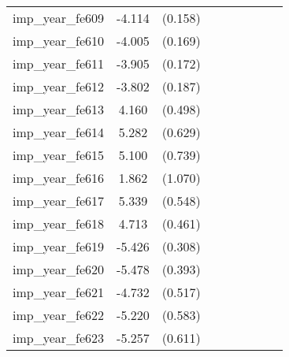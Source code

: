 {\begin{tabular}{l*{4}{cc}}
imp\_year\_fe609&   -4.114\sym{***}&  (0.158)&                  &         &                  &         &                  &         \\
imp\_year\_fe610&   -4.005\sym{***}&  (0.169)&                  &         &                  &         &                  &         \\
imp\_year\_fe611&   -3.905\sym{***}&  (0.172)&                  &         &                  &         &                  &         \\
imp\_year\_fe612&   -3.802\sym{***}&  (0.187)&                  &         &                  &         &                  &         \\
imp\_year\_fe613&    4.160\sym{***}&  (0.498)&                  &         &                  &         &                  &         \\
imp\_year\_fe614&    5.282\sym{***}&  (0.629)&                  &         &                  &         &                  &         \\
imp\_year\_fe615&    5.100\sym{***}&  (0.739)&                  &         &                  &         &                  &         \\
imp\_year\_fe616&    1.862         &  (1.070)&                  &         &                  &         &                  &         \\
imp\_year\_fe617&    5.339\sym{***}&  (0.548)&                  &         &                  &         &                  &         \\
imp\_year\_fe618&    4.713\sym{***}&  (0.461)&                  &         &                  &         &                  &         \\
imp\_year\_fe619&   -5.426\sym{***}&  (0.308)&                  &         &                  &         &                  &         \\
imp\_year\_fe620&   -5.478\sym{***}&  (0.393)&                  &         &                  &         &                  &         \\
imp\_year\_fe621&   -4.732\sym{***}&  (0.517)&                  &         &                  &         &                  &         \\
imp\_year\_fe622&   -5.220\sym{***}&  (0.583)&                  &         &                  &         &                  &         \\
imp\_year\_fe623&   -5.257\sym{***}&  (0.611)&                  &         &                  &         &                  &         \\

\end{tabular}}
